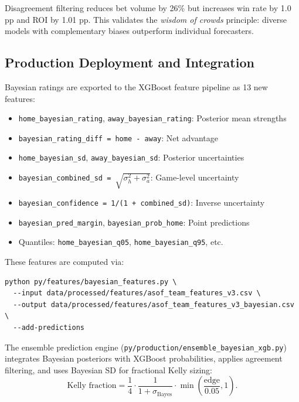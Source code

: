 Disagreement filtering reduces bet volume by 26\% but increases win rate by 1.0 pp and ROI by 1.01 pp. This validates the \emph{wisdom of crowds} principle: diverse models with complementary biases outperform individual forecasters.



\subsection{Production Deployment and Integration}

Bayesian ratings are exported to the XGBoost feature pipeline as 13 new features:
\begin{itemize}
  \item \texttt{home\_bayesian\_rating}, \texttt{away\_bayesian\_rating}: Posterior mean strengths
  \item \texttt{bayesian\_rating\_diff = home - away}: Net advantage
  \item \texttt{home\_bayesian\_sd}, \texttt{away\_bayesian\_sd}: Posterior uncertainties
  \item \texttt{bayesian\_combined\_sd = $\sqrt{\sigma_h^2 + \sigma_a^2}$}: Game-level uncertainty
  \item \texttt{bayesian\_confidence = 1/(1 + combined\_sd)}: Inverse uncertainty
  \item \texttt{bayesian\_pred\_margin}, \texttt{bayesian\_prob\_home}: Point predictions
  \item Quantiles: \texttt{home\_bayesian\_q05}, \texttt{home\_bayesian\_q95}, etc.
\end{itemize}

These features are computed via:
\begin{verbatim}
python py/features/bayesian_features.py \
  --input data/processed/features/asof_team_features_v3.csv \
  --output data/processed/features/asof_team_features_v3_bayesian.csv \
  --add-predictions
\end{verbatim}

The ensemble prediction engine (\texttt{py/production/ensemble\_bayesian\_xgb.py}) integrates Bayesian posteriors with XGBoost probabilities, applies agreement filtering, and uses Bayesian SD for fractional Kelly sizing:
\begin{equation}
\text{Kelly fraction} = \frac{1}{4} \cdot \frac{1}{1 + \sigma_{\text{Bayes}}} \cdot \min\left(\frac{\text{edge}}{0.05}, 1\right).
\end{equation}

